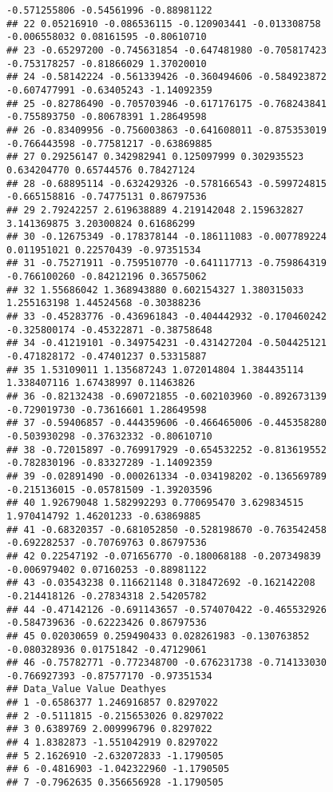\documentclass[]{article}
\begin{document}
\begin{verbatim}
-0.571255806 -0.54561996 -0.88981122
## 22 0.05216910 -0.086536115 -0.120903441 -0.013308758
-0.006558032 0.08161595 -0.80610710
## 23 -0.65297200 -0.745631854 -0.647481980 -0.705817423
-0.753178257 -0.81866029 1.37020010
## 24 -0.58142224 -0.561339426 -0.360494606 -0.584923872
-0.607477991 -0.63405243 -1.14092359
## 25 -0.82786490 -0.705703946 -0.617176175 -0.768243841
-0.755893750 -0.80678391 1.28649598
## 26 -0.83409956 -0.756003863 -0.641608011 -0.875353019
-0.766443598 -0.77581217 -0.63869885
## 27 0.29256147 0.342982941 0.125097999 0.302935523
0.634204770 0.65744576 0.78427124
## 28 -0.68895114 -0.632429326 -0.578166543 -0.599724815
-0.665158816 -0.74775131 0.86797536
## 29 2.79242257 2.619638889 4.219142048 2.159632827
3.141369875 3.20300824 0.61686299
## 30 -0.12675349 -0.178378144 -0.186111083 -0.007789224
0.011951021 0.22570439 -0.97351534
## 31 -0.75271911 -0.759510770 -0.641117713 -0.759864319
-0.766100260 -0.84212196 0.36575062
## 32 1.55686042 1.368943880 0.602154327 1.380315033
1.255163198 1.44524568 -0.30388236
## 33 -0.45283776 -0.436961843 -0.404442932 -0.170460242
-0.325800174 -0.45322871 -0.38758648
## 34 -0.41219101 -0.349754231 -0.431427204 -0.504425121
-0.471828172 -0.47401237 0.53315887
## 35 1.53109011 1.135687243 1.072014804 1.384435114
1.338407116 1.67438997 0.11463826
## 36 -0.82132438 -0.690721855 -0.602103960 -0.892673139
-0.729019730 -0.73616601 1.28649598
## 37 -0.59406857 -0.444359606 -0.466465006 -0.445358280
-0.503930298 -0.37632332 -0.80610710
## 38 -0.72015897 -0.769917929 -0.654532252 -0.813619552
-0.782830196 -0.83327289 -1.14092359
## 39 -0.02891490 -0.000261334 -0.034198202 -0.136569789
-0.215136015 -0.05781509 -1.39203596
## 40 1.92679048 1.582992293 0.770695470 3.629834515
1.970414792 1.46201233 -0.63869885
## 41 -0.68320357 -0.681052850 -0.528198670 -0.763542458
-0.692282537 -0.70769763 0.86797536
## 42 0.22547192 -0.071656770 -0.180068188 -0.207349839
-0.006979402 0.07160253 -0.88981122
## 43 -0.03543238 0.116621148 0.318472692 -0.162142208
-0.214418126 -0.27834318 2.54205782
## 44 -0.47142126 -0.691143657 -0.574070422 -0.465532926
-0.584739636 -0.62223426 0.86797536
## 45 0.02030659 0.259490433 0.028261983 -0.130763852
-0.080328936 0.01751842 -0.47129061
## 46 -0.75782771 -0.772348700 -0.676231738 -0.714133030
-0.766927393 -0.87577170 -0.97351534
## Data_Value Value Deathyes
## 1 -0.6586377 1.246916857 0.8297022
## 2 -0.5111815 -0.215653026 0.8297022
## 3 0.6389769 2.009996796 0.8297022
## 4 1.8382873 -1.551042919 0.8297022
## 5 2.1626910 -2.632072833 -1.1790505
## 6 -0.4816903 -1.042322960 -1.1790505
## 7 -0.7962635 0.356656928 -1.1790505

\end{verbatim}
\end{document}
